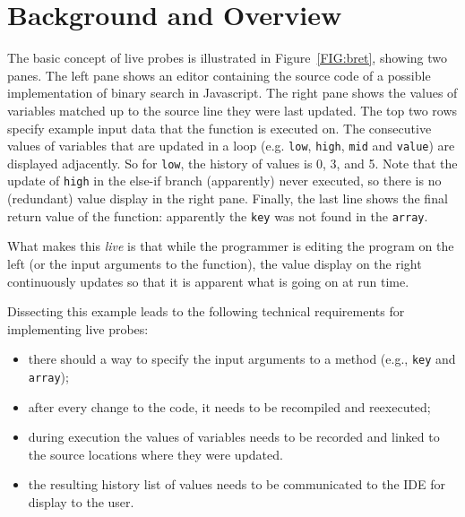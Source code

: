 \documentclass[english,submission]{programming}
\def\coolname{\textsc{LiveRec}\xspace}
\begin{document}
\section{Background and Overview}
\label{sec:problem-overview}

The basic concept of live probes is illustrated in Figure~\ref{FIG:bret}, showing two panes. 
The left pane shows an editor containing the source code of a possible implementation of binary search in Javascript. 
The right pane shows the values of variables matched up to the source line they were last updated.
The top two rows specify example input data that the function is executed on. 
The consecutive values of variables that are updated in a loop (e.g. \lstinline{low}, \lstinline{high}, \lstinline{mid} and \lstinline{value}) are displayed adjacently. 
So for \lstinline{low}, the history of values is 0, 3, and 5. Note that the update of \lstinline{high} in the else-if branch (apparently) never executed, so there is no (redundant) value display in the right pane. 
Finally, the last line shows the final return value of the function: apparently the \lstinline{key} was not found in the \lstinline[language=c]{array}. 

What makes this \textit{live} is that while the programmer is editing the program on the left (or the input arguments to the function), the value display on the right continuously updates so that it is apparent what is going on at run time. 

Dissecting this example leads to the following technical requirements for implementing live probes:
\begin{itemize}
  \item there should a way to specify the input arguments to a method (e.g., \lstinline{key} and \lstinline[language=c]{array});
  \item after every change to the code, it needs to be recompiled and reexecuted;
  \item during execution the values of variables needs to be recorded and linked to the source locations where they were updated.
  \item the resulting history list of values needs to be communicated to the IDE for display to the user.
\end{itemize}
\end{document}
